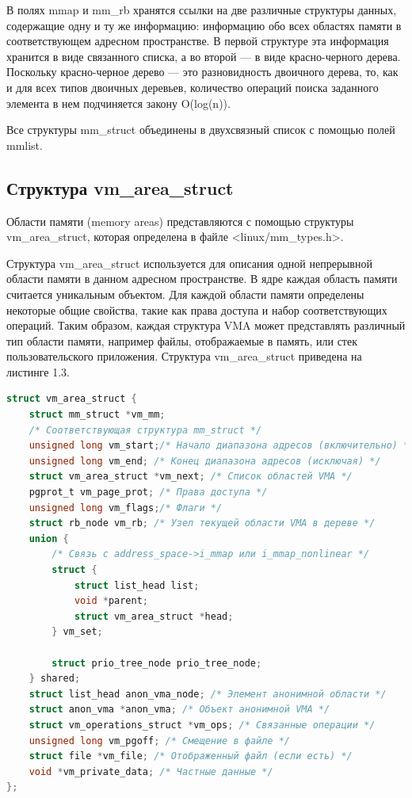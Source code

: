 В полях mmap и mm\_rb хранятся ссылки на две различные структуры данных, 
содержащие одну и ту же информацию: информацию обо всех областях памяти в 
соответствующем адресном пространстве. В первой структуре эта информация 
хранится в виде связанного списка, а во второй — в виде красно-черного дерева. 
Поскольку красно-черное дерево — это разновидность двоичного дерева, 
то, как и для всех типов двоичных деревьев,
количество операций поиска заданного элемента в нем подчиняется закону O(log(n)).

Все структуры mm\_struct объединены в двухсвязный список с помощью полей mmlist.

\subsection{Структура vm\_area\_struct}

Области памяти (memory areas) представляются с помощью структуры 
vm\_area\_struct, которая определена в файле <linux/mm\_types.h>.

Структура vm\_area\_struct используется для описания одной непрерывной 
области памяти в данном адресном пространстве. В ядре каждая область памяти считается
уникальным объектом. Для каждой области памяти определены некоторые общие 
свойства, такие как права доступа и набор соответствующих операций. Таким образом, 
каждая структура VMA может представлять различный тип области памяти, например 
файлы, отображаемые в память, или стек пользовательского приложения.
Структура vm\_area\_struct приведена на листинге 1.3.

\begin{lstlisting}[language=c, label=some-code, caption=Структура vm\_area\_struct]
struct vm_area_struct {
	struct mm_struct *vm_mm;
	/* Соответствующая структура mm_struct */
	unsigned long vm_start;/* Начало диапазона адресов (включительно) */
	unsigned long vm_end; /* Конец диапазона адресов (исключая) */
	struct vm_area_struct *vm_next; /* Список областей VMA */
	pgprot_t vm_page_prot; /* Права доступа */
	unsigned long vm_flags;/* Флаги */
	struct rb_node vm_rb; /* Узел текущей области VMA в дереве */
	union {
		/* Связь с address_space->i_mmap или i_mmap_nonlinear */
		struct {
			struct list_head list;
			void *parent;
			struct vm_area_struct *head;
		} vm_set;

		struct prio_tree_node prio_tree_node;
	} shared;
	struct list_head anon_vma_node; /* Элемент анонимной области */
	struct anon_vma *anon_vma; /* Объект анонимной VMA */
	struct vm_operations_struct *vm_ops; /* Связанные операции */
	unsigned long vm_pgoff; /* Смещение в файле */
	struct file *vm_file; /* Отображенный файл (если есть) */
	void *vm_private_data; /* Частные данные */
};
\end{lstlisting}

